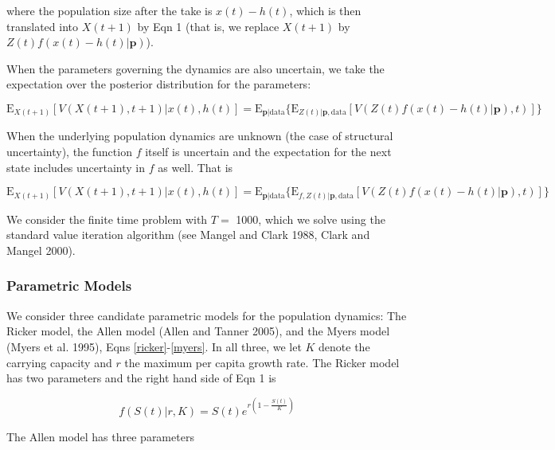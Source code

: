 \documentclass[author-year, 12pt,review]{components/elsarticle} %
\begin{document}
where the population size after the take is \(x(t) - h(t)\), which is
then translated into \(X(t+1)\) by Eqn 1 (that is, we replace \(X(t+1)\)
by \(Z(t) f(x(t)-h(t)|\mathbf{p})\)).

When the parameters governing the dynamics are also uncertain, we take
the expectation over the posterior distribution for the parameters:

\begin{equation}
\mathbf{\mathrm{E}}_{X(t+1)} \left[ V(X(t+1), t+1) | x(t), h(t) \right] = \mathbf{\mathrm{E}}_{\mathbf{p}|\mathrm{data}} \{ \mathbf{\mathrm{E}}_{Z(t) | \mathbf{p}, \mathrm{data}} \left[ V(Z(t) f(x(t) - h(t)|\mathbf{p}), t)  \right] \}
\end{equation}

When the underlying population dynamics are unknown (the case of
structural uncertainty), the function \(f\) itself is uncertain and the
expectation for the next state includes uncertainty in \(f\) as well.
That is

\begin{equation}
\mathbf{\mathrm{E}}_{X(t+1)} \left[ V(X(t+1), t+1) | x(t), h(t) \right] = \mathbf{\mathrm{E}}_{\mathbf{p}|\mathrm{data}} \{ \mathbf{\mathrm{E}}_{f, Z(t) | \mathbf{p}, \mathrm{data}} \left[ V( Z(t) f(x(t) - h(t)| \mathbf{p}), t) \right] \}
\end{equation}

We consider the finite time problem with \(T=\) 1000, which we solve
using the standard value iteration algorithm (see Mangel and Clark 1988,
Clark and Mangel 2000).

\subsubsection{Parametric Models}\label{parametric-models}

We consider three candidate parametric models for the population
dynamics: The Ricker model, the Allen model (Allen and Tanner 2005), and
the Myers model (Myers et al. 1995), Eqns \eqref{ricker}-\eqref{myers}.
In all three, we let \(K\) denote the carrying capacity and \(r\) the
maximum per capita growth rate. The Ricker model has two parameters and
the right hand side of Eqn 1 is

\begin{equation}
f(S(t)|r,K) = S(t) e^{r \left(1 - \frac{S(t)}{K} \right) } \label{ricker}
\end{equation}

The Allen model has three parameters
\end{document}
